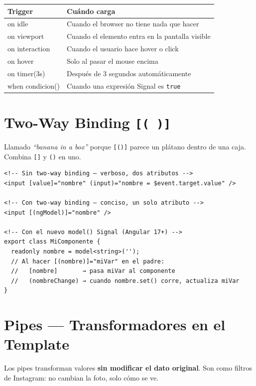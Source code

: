 \documentclass[12pt, a4paper]{article}
\begin{document}
\begin{center}
\renewcommand{\arraystretch}{1.5}
\begin{tabular}{>{\ttfamily}p{4.5cm} p{8cm}}
\toprule
\textbf{Trigger} & \textbf{Cuándo carga} \\
\midrule
on idle & Cuando el browser no tiene nada que hacer \\
on viewport & Cuando el elemento entra en la pantalla visible \\
on interaction & Cuando el usuario hace hover o click \\
on hover & Solo al pasar el mouse encima \\
on timer(3s) & Después de 3 segundos automáticamente \\
when condicion() & Cuando una expresión Signal es \texttt{true} \\
\bottomrule
\end{tabular}
\end{center}

\section{ Two-Way Binding \texttt{[( )]}}

Llamado \textit{``banana in a box''} porque \texttt{[()]} parece un
plátano dentro de una caja. Combina \texttt{[]} y \texttt{()} en uno.

\begin{lstlisting}
<!-- Sin two-way binding — verboso, dos atributos -->
<input [value]="nombre" (input)="nombre = $event.target.value" />

<!-- Con two-way binding — conciso, un solo atributo -->
<input [(ngModel)]="nombre" />

<!-- Con el nuevo model() Signal (Angular 17+) -->
export class MiComponente {
  readonly nombre = model<string>('');
  // Al hacer [(nombre)]="miVar" en el padre:
  //   [nombre]       → pasa miVar al componente
  //   (nombreChange) → cuando nombre.set() corre, actualiza miVar
}
\end{lstlisting}

\section{ Pipes --- Transformadores en el Template}

Los pipes transforman valores \textbf{sin modificar el dato original}.
Son como filtros de Instagram: no cambian la foto, solo cómo se ve.
\end{document}
